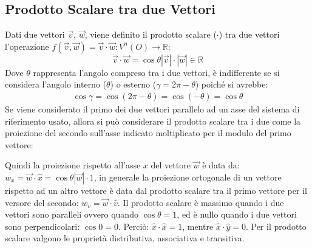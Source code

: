 \documentclass{article}
\numberwithin{equation}{subsection}
\begin{document}
\subsection{Prodotto Scalare tra due Vettori}
Dati due vettori $\vec{v}$, $\vec{w}$, viene definito il prodotto scalare ($\cdot$) tra due vettori l'operazione $f(\vec{v},\vec{w})=\vec{v}\cdot\vec{w}:V^{n}(O)\to\mathbb{R}$: 
\begin{equation}
    \vec{v}\cdot\vec{w} = \cos\theta |\vec{v}|\cdot|\vec{w}| \in \mathbb{R}
\end{equation}
Dove $\theta$ rappresenta l'angolo compreso tra i due vettori, è indifferente se si considera l'angolo interno ($\theta$) o esterno ($\gamma = 2\pi - \theta$) poiché si avrebbe:
\begin{gather*}
    \cos\gamma = \cos(2\pi - \theta) = \cos(-\theta) = \cos\theta
\end{gather*}
Se viene considerato il primo dei due vettori parallelo ad un asse del sistema di riferimento usato, allora si può considerare
il prodotto scalare tra i due come la proiezione del secondo sull'asse indicato moltiplicato per il modulo del primo vettore:

\begin{center}\end{center}

Quindi la proiezione rispetto all'asse $x$ del vettore 
$\vec{w}$ è data da: $w_x = \vec{w}\cdot\hat{x}= 
\cos\theta|\vec{w}|\cdot1$, in generale la proiezione 
ortogonale di un vettore rispetto ad un altro vettore è 
data dal prodotto scalare tra il primo vettore per il versore 
del secondo: $w_v = \vec{w}\cdot\hat{v}$.
Il prodotto scalare è massimo quando i due vettori sono 
paralleli ovvero quando $\cos\theta = 1$, ed è nullo
quando i due vettori sono perpendicolari: $\cos0 = 0$.
Perciò: $\hat{x}\cdot\hat{x} = 1$, mentre $\hat{x}\cdot\hat{y} = 0$. 
Per il prodotto scalare valgono le proprietà distributiva, associativa e
transitiva. 
\end{document}
